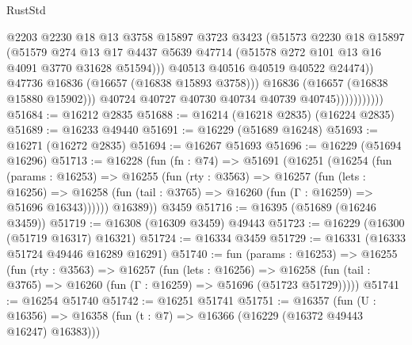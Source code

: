 \begin{lexlean}{RustStd}
\begin{coremodule}
                                  @2203
                                  @2230
                                  @18
                                  @13
                                  @3758
                                  @15897
                                  @3723
                                  @3423
                                  (@51573
                                    @2230
                                    @18
                                    @15897
                                    (@51579
                                      @274
                                      @13
                                      @17
                                      @4437
                                      @5639
                                      @47714
                                      (@51578 @272 @101 @13 @16 @4091 @3770 @31628 @51594)))
                                  @40513
                                  @40516
                                  @40519
                                  @40522
                                  @24474))
                              @47736
                              @16836
                              (@16657 (@16838 @15893 @3758)))
                            @16836
                            (@16657 (@16838 @15880 @15902)))
                          @40724
                          @40727
                          @40730
                          @40734
                          @40739
                          @40745)))))))))))
@51684 := @16212 @2835
@51688 := @16214 (@16218 @2835) (@16224 @2835)
@51689 := @16233 @49440
@51691 := @16229 (@51689 @16248)
@51693 := @16271 (@16272 @2835)
@51694 := @16267 @51693
@51696 := @16229 (@51694 @16296)
@51713 := @16228
    (fun (fn : @74) =>
    @51691
      (@16251
        (@16254
          (fun (params : @16253) =>
          @16255
            (fun (rty : @3563) =>
            @16257
              (fun (lets : @16256) =>
              @16258 (fun (tail : @3765) => @16260 (fun (Γ : @16259) => @51696 @16343))))))
        @16389))
    @3459
@51716 := @16395 (@51689 (@16246 @3459))
@51719 := @16308 (@16309 @3459) @49443
@51723 := @16229 (@16300 (@51719 @16317) @16321)
@51724 := @16334 @3459
@51729 := @16331 (@16333 @51724 @49446 @16289 @16291)
@51740 := fun (params : @16253) =>
  @16255
    (fun (rty : @3563) =>
    @16257
      (fun (lets : @16256) =>
      @16258 (fun (tail : @3765) => @16260 (fun (Γ : @16259) => @51696 (@51723 @51729)))))
@51741 := @16254 @51740
@51742 := @16251 @51741
@51751 := @16357
    (fun (U : @16356) => @16358 (fun (t : @7) => @16366 (@16229 (@16372 @49443 @16247) @16383)))

\end{coremodule}
\end{lexlean}
